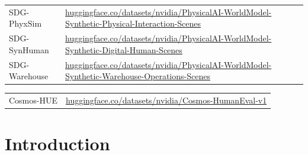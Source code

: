 \documentclass{llmxive}
\begin{document}
\begin{tcolorbox}[
    colback=black!2,
    colframe=nvidiagreen!75!white,
    boxrule=0.4pt,
    arc=1pt,
    left=4pt,
    right=4pt,
    top=4pt,
    bottom=4pt,
    title=Open Synthetic Dataset
]
\small
\begin{tabular}{p{4.5cm}l}
SDG-PhyxSim & {\normalfont\scriptsize\href{https://huggingface.co/datasets/nvidia/PhysicalAI-WorldModel-Synthetic-Physical-Interaction-Scenes}{huggingface.co/datasets/nvidia/PhysicalAI-WorldModel-Synthetic-Physical-Interaction-Scenes}} \\
SDG-SynHuman & {\normalfont\scriptsize\href{https://huggingface.co/datasets/nvidia/PhysicalAI-WorldModel-Synthetic-Digital-Human-Scenes}{huggingface.co/datasets/nvidia/PhysicalAI-WorldModel-Synthetic-Digital-Human-Scenes}} \\
SDG-Warehouse & {\normalfont\scriptsize\href{https://huggingface.co/datasets/nvidia/PhysicalAI-WorldModel-Synthetic-Warehouse-Operations-Scenes}{huggingface.co/datasets/nvidia/PhysicalAI-WorldModel-Synthetic-Warehouse-Operations-Scenes}} \\
\end{tabular}
\end{tcolorbox}

\begin{tcolorbox}[
    colback=black!2,
    colframe=nvidiagreen!75!white,
    boxrule=0.4pt,
    arc=1pt,
    left=4pt,
    right=4pt,
    top=4pt,
    bottom=4pt,
    title=Open Evaluation Benchmark
]
\small
\begin{tabular}{p{4.5cm}l}
Cosmos-HUE & {\normalfont\scriptsize\href{https://huggingface.co/datasets/nvidia/Cosmos-HumanEval-v1}{huggingface.co/datasets/nvidia/Cosmos-HumanEval-v1}} \\
\end{tabular}
\end{tcolorbox}



\tableofcontents


\section{Introduction}
\label{sec::intro}
\end{document}
